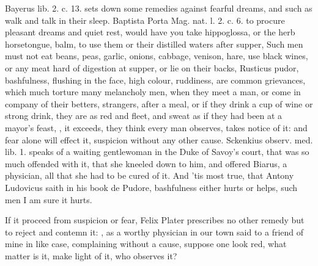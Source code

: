 Bayerus lib. 2. c. 13. sets down some remedies against fearful
dreams, and such as walk and talk in their sleep. Baptista Porta Mag.
nat. l. 2. c. 6. to procure pleasant dreams and quiet rest, would have
you take hippoglossa, or the herb horsetongue, balm, to use them or
their distilled waters after supper, \etc{} Such men must not eat beans,
peas, garlic, onions, cabbage, venison, hare, use black wines, or any
meat hard of digestion at supper, or lie on their backs, \etc{}
Rusticus pudor, bashfulness, flushing in the face, high colour,
ruddiness, are common grievances, which much torture many melancholy
men, when they meet a man, or come in company of their betters,
strangers, after a meal, or if they drink a cup of wine or strong
drink, they are as red and fleet, and sweat as if they had been at a
mayor's feast, , it exceeds, they
think every man observes, takes notice of it: and fear alone will
effect it, suspicion without any other cause. Sckenkius observ. med.
lib. 1. speaks of a waiting gentlewoman in the Duke of Savoy's court,
that was so much offended with it, that she kneeled down to him, and
offered Biarus, a physician, all that she had to be cured of it. And
'tis most true, that Antony Ludovicus saith in his book de
Pudore, bashfulness either hurts or helps, such men I am sure it hurts.

If it proceed from suspicion or fear, Felix Plater prescribes no
other remedy but to reject and contemn it: ,
as a worthy physician in our town said to a friend of mine in
like case, complaining without a cause, suppose one look red, what
matter is it, make light of it, who observes it?

